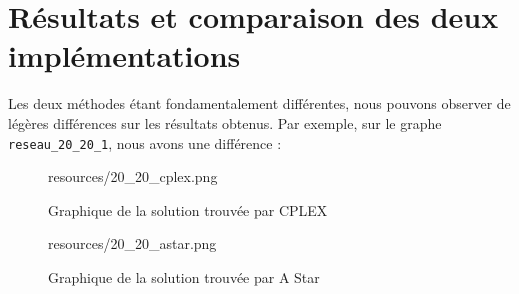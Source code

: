 \section{Résultats et comparaison des deux implémentations}
\label{sec:shortest_path_comparison}

Les deux méthodes étant fondamentalement différentes, nous pouvons observer de légères différences sur les résultats obtenus. Par exemple, sur le graphe \texttt{reseau\_20\_20\_1}, nous avons une différence :

\begin{figure}[H]
    \centering
    \begin{includegraphics}[width=.6\textwidth]{resources/20_20_cplex.png}
    \end{includegraphics}
    \caption{Graphique de la solution trouvée par CPLEX}
    \label{fig:cplex_2020}
\end{figure}

\begin{figure}[H]
    \centering
    \begin{includegraphics}[width=.6\textwidth]{resources/20_20_astar.png}
    \end{includegraphics}
    \caption{Graphique de la solution trouvée par A Star}
    \label{fig:astar_2020}
\end{figure}